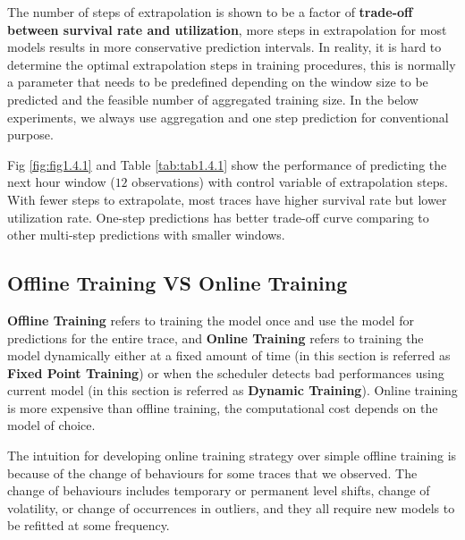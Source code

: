 \documentclass{article}
\begin{document}
\begin{flushleft}
The number of steps of extrapolation is shown to be a factor of \textbf{trade-off between survival rate and utilization}, more steps in extrapolation for most models results in more conservative prediction intervals.
In reality, it is hard to determine the optimal extrapolation steps in training procedures, this is normally a parameter that needs to be predefined depending on the window size to be predicted and the feasible number of aggregated training size. In the below experiments, we always use aggregation and one step prediction for conventional purpose.
\end{flushleft}

\begin{flushleft}
Fig \ref{fig:fig1.4.1} and Table \ref{tab:tab1.4.1} show the performance of predicting the next hour window ($12$ observations) with control variable of extrapolation steps. With fewer steps to extrapolate, most traces have higher survival rate but lower utilization rate. One-step predictions has better trade-off curve comparing to other multi-step predictions with smaller windows.
\end{flushleft}

\subsection{Offline Training VS Online Training}

\begin{flushleft}
\textbf{Offline Training} refers to training the model once and use the model for predictions for the entire trace, and \textbf{Online Training} refers to training the model dynamically either at a fixed amount of time (in this section is referred as \textbf{Fixed Point Training}) or when the scheduler detects bad performances using current model (in this section is referred as \textbf{Dynamic Training}). Online training is more expensive than offline training, the computational cost depends on the model of choice.
\end{flushleft}

\begin{flushleft}
The intuition for developing online training strategy over simple offline training is because of the change of behaviours for some traces that we observed. The change of behaviours includes temporary or permanent level shifts, change of volatility, or change of occurrences in outliers, and they all require new models to be refitted at some frequency.
\end{flushleft}
\end{document}
